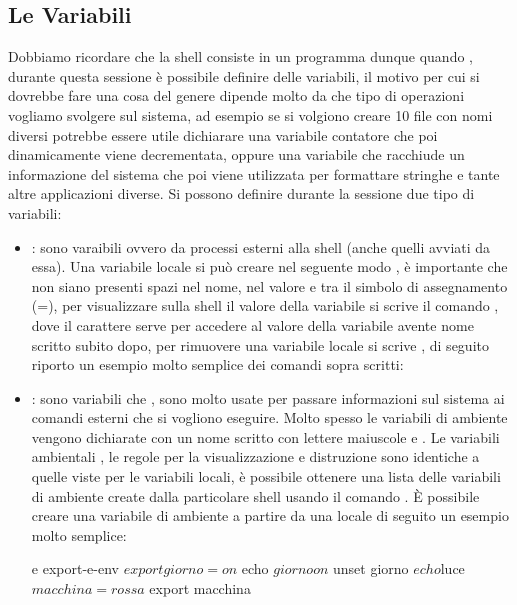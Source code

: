 \subsection{Le Variabili}
\label{subsec:Le-Variabili}
Dobbiamo ricordare che la shell consiste in un programma dunque quando , durante questa sessione è possibile definire delle variabili, il motivo per cui si dovrebbe fare una cosa del genere dipende molto da che tipo di operazioni vogliamo svolgere sul sistema, ad esempio se si volgiono creare 10 file con nomi diversi potrebbe essere utile dichiarare una variabile contatore che poi dinamicamente viene decrementata, oppure una variabile che racchiude un informazione del sistema che poi viene utilizzata per formattare stringhe e tante altre applicazioni diverse. Si possono definire durante la sessione due tipo di variabili:
\begin{itemize}
    \item {}: sono varaibili  ovvero da processi esterni alla shell (anche quelli avviati da essa). Una variabile locale si può creare nel seguente modo , è importante che non siano presenti spazi nel nome, nel valore e tra il simbolo di assegnamento (=), per visualizzare sulla shell il valore della variabile si scrive il comando , dove il carattere \ti{\$} serve per accedere al valore della variabile avente nome scritto subito dopo, per rimuovere una variabile locale si scrive , di seguito riporto un esempio molto semplice dei comandi sopra scritti:
    \item {}: sono variabili che , sono molto usate per passare informazioni sul sistema ai comandi esterni che si vogliono eseguire. Molto spesso le variabili di ambiente vengono dichiarate con un nome scritto con lettere maiuscole e . Le variabili ambientali , le regole per la visualizzazione e distruzione sono identiche a quelle viste per le variabili locali, è possibile ottenere una lista delle variabili di ambiente create dalla particolare shell usando il comando . È possibile creare una variabile di ambiente a partire da una locale di seguito un esempio molto semplice:
    \begin{cmdc}{ e }{export-e-env}
	$ export giorno=on
	$ echo $giorno
	on
	$ unset giorno
	$ echo $luce
	$ macchina=rossa
	$ export macchina
    \end{cmdc}
    
\end{itemize}

